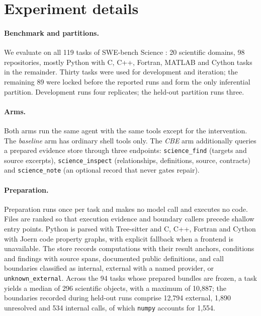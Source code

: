 
\section*{Experiment details}

\paragraph{Benchmark and partitions.}
We evaluate on all 119 tasks of SWE-bench Science \cite{xu2026swebenchscience}: 20 scientific
domains, 98 repositories, mostly Python with C, C++, Fortran, MATLAB and Cython tasks in the
remainder. Thirty tasks were used for development and iteration; the remaining 89 were locked
before the reported runs and form the only inferential partition. Development runs four
replicates; the held-out partition runs three.

\paragraph{Arms.}
Both arms run the same agent with the same tools except for the intervention.
The \emph{baseline} arm has ordinary shell tools only. The \emph{CBE} arm additionally queries a
prepared evidence store through three endpoints: \texttt{science\_find} (targets and source
excerpts), \texttt{science\_inspect} (relationships, definitions, source, contracts) and
\texttt{science\_note} (an optional record that never gates repair).

\paragraph{Preparation.}
Preparation runs once per task and makes no model call and executes no code. Files are ranked so
that execution evidence and boundary callers precede shallow entry points. Python is parsed with
Tree-sitter and C, C++, Fortran and Cython with Joern code property graphs, with explicit fallback
when a frontend is unavailable. The store records computations with their result anchors,
conditions and findings with source spans, documented public definitions, and call boundaries
classified as internal, external with a named provider, or \texttt{unknown\_external}. Across the
94 tasks whose prepared bundles are frozen, a task yields a median of 296 scientific objects,
with a maximum of 10{,}887; the boundaries recorded during held-out runs comprise 12{,}794
external, 1{,}890 unresolved and 534 internal calls, of which \texttt{numpy} accounts for 1{,}554.

